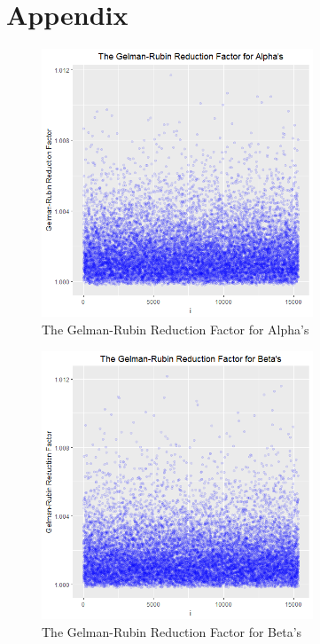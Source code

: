 \documentclass[twoside,onecolumn]{article}
\begin{document}
\newpage
\section*{Appendix}
\begin{figure}[H]
\centering
\includegraphics[height=8cm]{gelman_alpha_summary}
\caption{The Gelman-Rubin Reduction Factor for Alpha's}
\label{fig:gelman_alpha_summary}
\end{figure}

\begin{figure}[H]
\centering
\includegraphics[height=8cm]{gelman_beta_summary}
\caption{The Gelman-Rubin Reduction Factor for Beta's}
\label{fig:gelman_beta_summary}
\end{figure}
\end{document}

